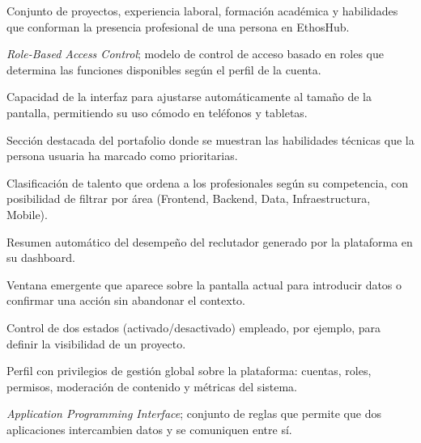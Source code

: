 \begin{description}[style=unboxed,leftmargin=0pt,itemsep=4pt]
    \item[\textcolor{colorPrimario}{\textbf{Portafolio}}] Conjunto de proyectos,
    experiencia laboral, formación académica y habilidades que conforman la presencia
    profesional de una persona en EthosHub.

    \item[\textcolor{colorPrimario}{\textbf{RBAC}}] \textit{Role-Based Access Control};
    modelo de control de acceso basado en roles que determina las funciones disponibles
    según el perfil de la cuenta.

    \item[\textcolor{colorPrimario}{\textbf{Responsive (diseño adaptable)}}] Capacidad
    de la interfaz para ajustarse automáticamente al tamaño de la pantalla, permitiendo
    su uso cómodo en teléfonos y tabletas.

    \item[\textcolor{colorPrimario}{\textbf{Top Skills}}] Sección destacada del
    portafolio donde se muestran las habilidades técnicas que la persona usuaria ha
    marcado como prioritarias.

    \item[\textcolor{colorPrimario}{\textbf{Ranking}}] Clasificación de talento que
    ordena a los profesionales según su competencia, con posibilidad de filtrar por
    área (Frontend, Backend, Data, Infraestructura, Mobile).

    \item[\textcolor{colorPrimario}{\textbf{Insight de la semana}}] Resumen automático
    del desempeño del reclutador generado por la plataforma en su dashboard.

    \item[\textcolor{colorPrimario}{\textbf{Modal}}] Ventana emergente que aparece sobre
    la pantalla actual para introducir datos o confirmar una acción sin abandonar el
    contexto.

    \item[\textcolor{colorPrimario}{\textbf{Toggle (interruptor)}}] Control de dos
    estados (activado/desactivado) empleado, por ejemplo, para definir la visibilidad
    de un proyecto.

    \item[\textcolor{colorPrimario}{\textbf{Administrador}}] Perfil con privilegios de
    gestión global sobre la plataforma: cuentas, roles, permisos, moderación de
    contenido y métricas del sistema.

    \item[\textcolor{colorPrimario}{\textbf{API}}] \textit{Application Programming
    Interface}; conjunto de reglas que permite que dos aplicaciones intercambien datos y
    se comuniquen entre sí.


\end{description}
